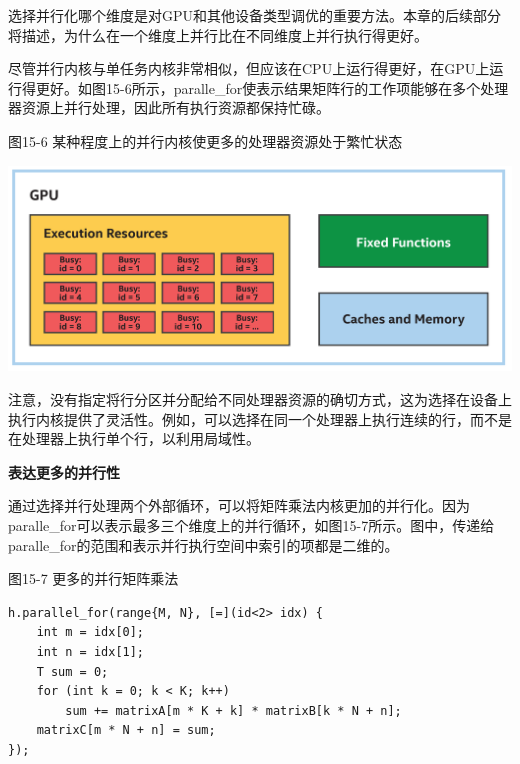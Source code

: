\begin{tcolorbox}[colback=blue!5!white,colframe=blue!75!black, title=选择如何并行化]
选择并行化哪个维度是对GPU和其他设备类型调优的重要方法。本章的后续部分将描述，为什么在一个维度上并行比在不同维度上并行执行得更好。
\end{tcolorbox}

尽管并行内核与单任务内核非常相似，但应该在CPU上运行得更好，在GPU上运行得更好。如图15-6所示，paralle\_for使表示结果矩阵行的工作项能够在多个处理器资源上并行处理，因此所有执行资源都保持忙碌。\par

\hspace*{\fill} \par %
图15-6 某种程度上的并行内核使更多的处理器资源处于繁忙状态
\begin{center}
	\includegraphics[width=1.0\textwidth]{content/chapter-15/images/5}
\end{center}

注意，没有指定将行分区并分配给不同处理器资源的确切方式，这为选择在设备上执行内核提供了灵活性。例如，可以选择在同一个处理器上执行连续的行，而不是在处理器上执行单个行，以利用局域性。\par

\hspace*{\fill} \par %
\textbf{表达更多的并行性}

通过选择并行处理两个外部循环，可以将矩阵乘法内核更加的并行化。因为paralle\_for可以表示最多三个维度上的并行循环，如图15-7所示。图中，传递给paralle\_for的范围和表示并行执行空间中索引的项都是二维的。\par

\hspace*{\fill} \par %
图15-7 更多的并行矩阵乘法
\begin{lstlisting}[caption={}]
h.parallel_for(range{M, N}, [=](id<2> idx) {
	int m = idx[0];
	int n = idx[1];
	T sum = 0;
	for (int k = 0; k < K; k++)
		sum += matrixA[m * K + k] * matrixB[k * N + n];
	matrixC[m * N + n] = sum;
});
\end{lstlisting}

